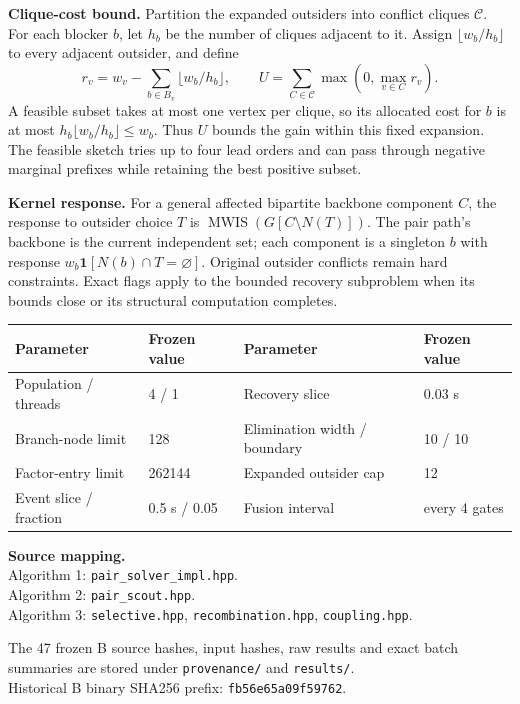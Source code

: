 \documentclass[10pt,a4paper]{article}
\newcommand{\Ind}{\mathbf 1}
\newcommand{\MWIS}{\operatorname{MWIS}}
\begin{document}
\textbf{Clique-cost bound.}
Partition the expanded outsiders into conflict cliques $\mathcal C$.
For each blocker $b$, let $h_b$ be the number of cliques adjacent to it.
Assign $\lfloor w_b/h_b\rfloor$ to every adjacent outsider, and define
\begin{equation}
r_v=w_v-\sum_{b\in B_v}\lfloor w_b/h_b\rfloor,\qquad
U=\sum_{C\in\mathcal C}\max(0,\max_{v\in C}r_v).
\end{equation}
A feasible subset takes at most one vertex per clique, so its allocated
cost for $b$ is at most $h_b\lfloor w_b/h_b\rfloor\leq w_b$.
Thus $U$ bounds the gain within this fixed expansion. The feasible
sketch tries up to four lead orders and can pass through negative
marginal prefixes while retaining the best positive subset.

\textbf{Kernel response.}
For a general affected bipartite backbone component $C$, the response
to outsider choice $T$ is $\MWIS(G[C\setminus N(T)])$.
The pair path's backbone is the current independent set; each component
is a singleton $b$ with response $w_b\Ind[N(b)\cap T=\varnothing]$.
Original outsider conflicts remain hard constraints. Exact flags apply
to the bounded recovery subproblem when its bounds close or its
structural computation completes.

\begin{center}\small
\begin{tabular}{ll@{\qquad}ll}
\toprule
Parameter & Frozen value & Parameter & Frozen value\\
\midrule
Population / threads & 4 / 1 & Recovery slice & 0.03 s\\
Branch-node limit & 128 & Elimination width / boundary & 10 / 10\\
Factor-entry limit & 262144 & Expanded outsider cap & 12\\
Event slice / fraction & 0.5 s / 0.05 & Fusion interval & every 4 gates\\
\bottomrule
\end{tabular}
\end{center}
\textbf{Source mapping.}\\
Algorithm 1: \texttt{pair\_solver\_impl.hpp}.\\
Algorithm 2: \texttt{pair\_scout.hpp}.\\
Algorithm 3: \texttt{selective.hpp}, \texttt{recombination.hpp}, \texttt{coupling.hpp}.

The 47 frozen B source hashes, input hashes, raw results and exact batch
summaries are stored under \texttt{provenance/} and \texttt{results/}.\\
Historical B binary SHA256 prefix: \texttt{fb56e65a09f59762}.
\end{document}
